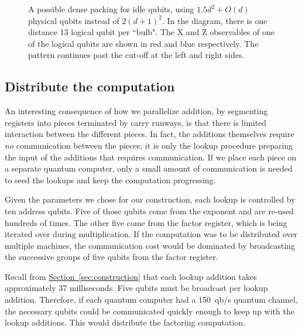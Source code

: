 \documentclass[a4paper, onecolumn, accepted=2021-03-29]{quantumarticle}
\renewcommand{\sec}[1]{\hyperref[sec:#1]{Section~\ref*{sec:#1}}}
\begin{document}
\begin{figure}
    \caption{
        A possible dense packing for idle qubits, using $1.5d^2 + O(d)$ physical qubits instead of $2(d+1)^2$.
        In the diagram, there is one distance 13 logical qubit per ``bulb".
        The X and Z observables of one of the logical qubits are shown in red and blue respectively.
        The pattern continues past the cut-off at the left and right sides.
    }
    \label{fig:qubit-houses}
\end{figure}




\subsection{Distribute the computation}

An interesting consequence of how we parallelize addition, by segmenting registers into pieces terminated by carry runways, is that there is limited interaction between the different pieces.
In fact, the additions themselves require {\em no} communication between the pieces; it is only the lookup procedure preparing the input of the additions that requires communication.
If we place each piece on a separate quantum computer, only a small amount of communication is needed to seed the lookups and keep the computation progressing.

Given the parameters we chose for our construction, each lookup is controlled by ten address qubits.
Five of those qubits come from the exponent and are re-used hundreds of times.
The other five come from the factor register, which is being iterated over during multiplication.
If the computation was to be distributed over multiple machines, the communication cost would be dominated by broadcasting the successive groups of five qubits from the factor register.

Recall from \sec{construction} that each lookup addition takes approximately 37 milliseconds.
Five qubits must be broadcast per lookup addition.
Therefore, if each quantum computer had a 150~qb/s quantum channel, the necessary qubits could be communicated quickly enough to keep up with the lookup additions.
This would distribute the factoring computation.
\end{document}
